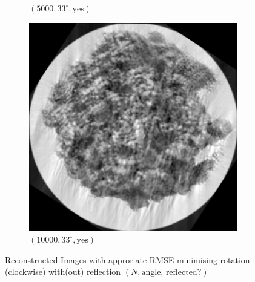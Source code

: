 \documentclass[a4paper, landscape]{article}
\begin{document}
\begin{figure}[H]
\begin{subfigure}{0.13\linewidth}
		\caption{$(5000, 33^\circ, \text{yes})$}
	\end{subfigure}
	\begin{subfigure}{0.13\linewidth}
		\centering
		\includegraphics[width=\linewidth]{results/cryoem, N = 10000, reflected and rotated by angle = 33.png}
		\caption{$(10000, 33^\circ, \text{yes})$}
	\end{subfigure}
	\caption{Reconstructed Images with approriate RMSE minimising rotation (clockwise) with(out) reflection $(N, \text{angle, reflected?})$}
	\label{fig:rif}
\end{figure}
\end{document}
